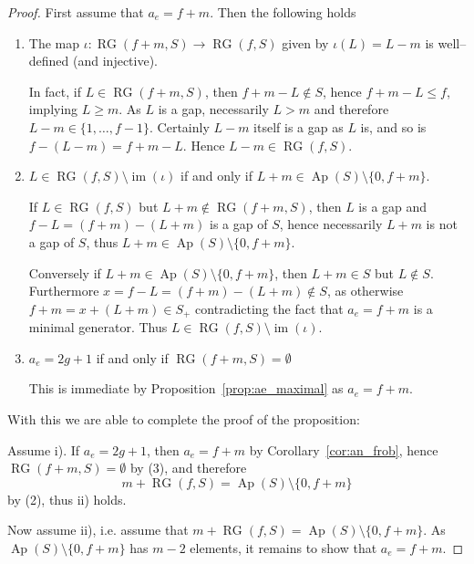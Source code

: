 \documentclass[10pt,a4paper]{amsart}
\begin{document}
\begin{proof}
First assume that $a_e = f+m$. Then the following holds 

\begin{enumerate}
\item The map $\iota: \operatorname{RG}(f+m, S) \longrightarrow 
\operatorname{RG}(f, S)$ given by $\iota(L) = L-m$ is well--defined (and injective). 

In fact, if $L \in \operatorname{RG}(f+m, S)$, then $f+m-L \notin S$, hence 
$f+m-L  \leq f$, implying $L \geq m$. As $L$ is a gap, necessarily $L > m$ and 
therefore $L-m \in \{1, \ldots, f-1\}$. Certainly $L-m$ itself is a gap as $L$ is, and so is 
$f-(L-m)=f+m-L$. Hence $L-m \in \operatorname{RG}(f, S)$. 
\item $L \in \operatorname{RG}(f, S) \setminus \operatorname{im}(\iota)$ if and only 
if $L + m \in \operatorname{Ap}(S) \setminus \{0, f+m\}$. 

If $L \in \operatorname{RG}(f, S)$ but $L+m \notin  \operatorname{RG}(f+m, S)$, 
then $L$ is a gap and $f-L = (f+m) - (L+m)$ is a gap of $S$, hence necessarily 
$L+m$ is not a gap of $S$, thus $L + m \in \operatorname{Ap}(S)\setminus \{0, f+m\}$. 

Conversely if $L+m  \in \operatorname{Ap}(S) \setminus \{0, f+m\}$, then 
$L+m \in S$ but $L \notin S$. Furthermore $x=f-L = (f+m) - (L+m) \notin S$, as 
otherwise $f+m = x+(L+m) \in S_+$ contradicting the fact that $a_e = f+m$ is a minimal 
generator. Thus $L \in \operatorname{RG}(f, S) \setminus \operatorname{im}(\iota)$. 
\item $a_e = 2g+1$ if and only if $\operatorname{RG}(f+m, S) = \emptyset$

This is immediate by Proposition~\ref{prop:ae_maximal} as $a_e = f+m$.  
\end{enumerate}
\bigbreak

With this we are able to complete the proof of the proposition: 

Assume i). If $a_e = 2g+1$, then $a_e = f+ m$ by 
Corollary~\ref{cor:an_frob}, hence 
$\operatorname{RG}(f+m, S) = \emptyset$ by (3), and therefore 
	$$ m+\operatorname{RG}(f, S) 
	= \operatorname{Ap}(S) \setminus \{0, f+m\} $$ 
by (2), thus ii) holds.
 
Now assume ii), i.e. assume that $m+\operatorname{RG}(f, S) = 
\operatorname{Ap}(S) \setminus \{0, f+m\}$. 
As $\operatorname{Ap}(S) \setminus \{0, f+m\} $ has $m-2$ 
elements, it remains to show that $a_e = f+m$. 


\end{proof}
\end{document}
